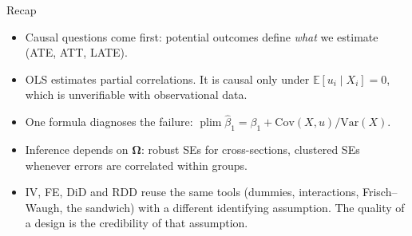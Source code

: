 \documentclass[9pt,aspectratio=169]{beamer}
\newcommand{\E}{\mathbb{E}}
\newcommand{\Var}{\mathrm{Var}}
\newcommand{\Cov}{\mathrm{Cov}}
\newcommand{\plim}{\operatorname{plim}}
\begin{document}
\begin{frame}{Recap}
\linespread{1.2}\selectfont
  \begin{itemize}
    \item Causal questions come first: potential outcomes define \emph{what} we estimate (ATE, ATT, LATE).
    \item OLS estimates partial correlations. It is causal only under $\E[u_i\mid X_i]=0$, which is unverifiable with observational data.
    \item One formula diagnoses the failure: $\plim\hat\beta_1=\beta_1+\Cov(X,u)/\Var(X)$.
    \item Inference depends on $\bm\Omega$: robust SEs for cross-sections, clustered SEs whenever errors are correlated within groups.
    \item IV, FE, DiD and RDD reuse the same tools (dummies, interactions, Frisch--Waugh, the sandwich) with a different identifying assumption. The quality of a design is the credibility of that assumption.
  \end{itemize}
\end{frame}
\end{document}
